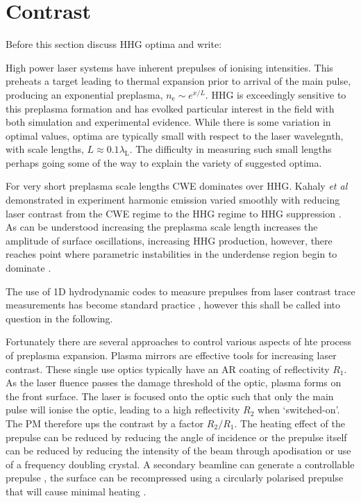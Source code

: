 \section{Contrast}
Before this section discuss HHG optima and write: 

High power laser systems have inherent prepulses of ionising intensities. This preheats a target leading to thermal expansion prior to arrival of the main pulse, producing an exponential preplasma, $n_\mathrm{e} \sim e^{x/L}$. HHG is exceedingly sensitive to this preplasma formation and has evolked particular interest in the field \cite{behmkeControllingSpacingAttosecond2011, rodelHarmonicGenerationRelativistic2012, dollarScalingHighorderHarmonic2013, kahalyDirectObservationDensityGradient2013, vincentiAchievingExtremeLight2019,behmkeControllingSpacingAttosecond2011} with both simulation and experimental evidence. While there is some variation in optimal values, optima are typically small with respect to the laser wavelegnth, with scale lengths, $L \approx 0.1 \lambda_\mathrm{L}$. The difficulty in measuring such small lengths perhaps going some of the way to explain the variety of suggested optima. 

For very short preplasma scale lengths \ac{CWE} dominates over HHG. Kahaly \textit{et al} demonstrated in experiment harmonic emission varied smoothly with reducing laser contrast from the CWE regime to the HHG regime to HHG suppression \cite{kahalyDirectObservationDensityGradient2013}. As can be understood increasing the preplasma scale length increases the amplitude of surface oscillations, increasing HHG production, however, there reaches point where parametric instabilities in the underdense region begin to dominate \cite{dollarScalingHighorderHarmonic2013}.

The use of 1D hydrodynamic codes to measure prepulses from laser contrast trace measurements has become standard practice \cite{behmkeControllingSpacingAttosecond2011, dollarScalingHighorderHarmonic2013, liExperimentalDemonstrationEfficient2022}, however this shall be called into question in the following.

Fortunately there are several approaches to control various aspects of hte process of preplasma expansion. Plasma mirrors are effective tools for increasing laser contrast. These single use optics typically have an \ac{AR} coating of reflectivity $R_1$. As the laser fluence passes the damage threshold of the optic, plasma forms on the front surface. The laser is focused onto the optic such that only the main pulse will ionise the optic, leading to a high reflectivity $R_2$ when `switched-on'. The \ac{PM} therefore ups the contrast by a factor $R_2/R_1$. The heating effect of the prepulse can be reduced by reducing the angle of incidence or the prepulse itself can be reduced by reducing the intensity of the beam through apodisation or use of a frequency doubling crystal. A secondary beamline can generate a controllable prepulse \cite{kahalyDirectObservationDensityGradient2013}, the surface can be recompressed using a circularly polarised prepulse that will cause minimal heating \cite{liExperimentalDemonstrationEfficient2022}.


